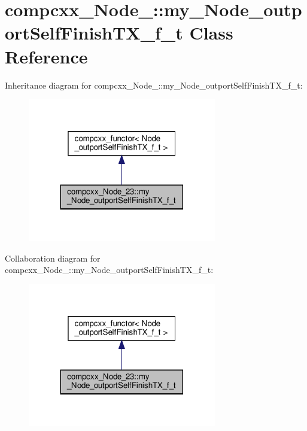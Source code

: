 \hypertarget{classcompcxx__Node__23_1_1my__Node__outportSelfFinishTX__f__t}{}\section{compcxx\+\_\+\+Node\+\_\+:\+:my\+\_\+\+Node\+\_\+outport\+Self\+Finish\+T\+X\+\_\+f\+\_\+t Class Reference}
\label{classcompcxx__Node__23_1_1my__Node__outportSelfFinishTX__f__t}


Inheritance diagram for compcxx\+\_\+\+Node\+\_\+:\+:my\+\_\+\+Node\+\_\+outport\+Self\+Finish\+T\+X\+\_\+f\+\_\+t\+:\nopagebreak
\begin{figure}[H]
\begin{center}
\leavevmode
\includegraphics[width=233pt]{classcompcxx__Node__23_1_1my__Node__outportSelfFinishTX__f__t__inherit__graph}
\end{center}
\end{figure}


Collaboration diagram for compcxx\+\_\+\+Node\+\_\+:\+:my\+\_\+\+Node\+\_\+outport\+Self\+Finish\+T\+X\+\_\+f\+\_\+t\+:\nopagebreak
\begin{figure}[H]
\begin{center}
\leavevmode
\includegraphics[width=233pt]{classcompcxx__Node__23_1_1my__Node__outportSelfFinishTX__f__t__coll__graph}
\end{center}
\end{figure}
